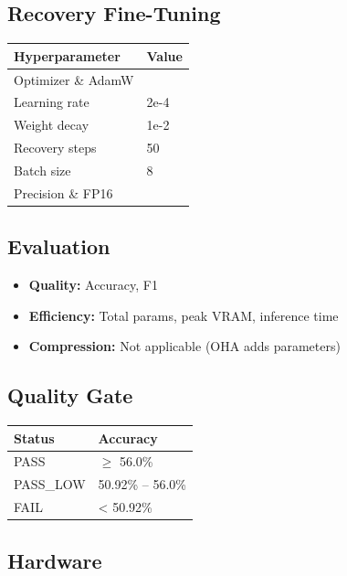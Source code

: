 \subsection{Recovery Fine-Tuning}

\begin{table}[H]
\centering
\small
\begin{tabular}{ll}
\toprule
\textbf{Hyperparameter} & \textbf{Value} \\
\midrule
Optimizer \& AdamW \\
Learning rate & 2e-4 \\
Weight decay & 1e-2 \\
Recovery steps & 50 \\
Batch size & 8 \\
Precision \& FP16 \\
\bottomrule
\end{tabular}
\end{table}

\subsection{Evaluation}

\begin{itemize}
\item \textbf{Quality:} Accuracy, F1
\item \textbf{Efficiency:} Total params, peak VRAM, inference time
\item \textbf{Compression:} Not applicable (OHA adds parameters)

\end{itemize}
\subsection{Quality Gate}

\begin{table}[H]
\centering
\small
\begin{tabular}{ll}
\toprule
\textbf{Status} & \textbf{Accuracy} \\
\midrule
PASS & $\ge$ 56.0\% \\
PASS\_LOW & 50.92\% -- 56.0\% \\
FAIL & < 50.92\% \\
\bottomrule
\end{tabular}
\end{table}

\subsection{Hardware}

